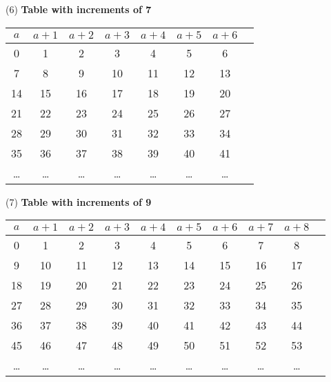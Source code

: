 \noindent
(6) \textbf{Table with increments of 7}\\
\begin{tabular}{c|ccccccc}
    $a$                        & $a+1$                       & $a+2$                       & $a+3$ & $a+4$ & $a+5$ & $a+6$ \\
    \hline
    \rowcolor{OliveGreen!10}0  & 1                           & 2                           & 3     & 4     & 5     & 6     \\
    \cellcolor{OliveGreen!10}7 & \cellcolor{OliveGreen!10} 8 & \cellcolor{OliveGreen!10} 9 & 10    & 11    & 12    & 13    \\
    14                         & 15                          & 16                          & 17    & 18    & 19    & 20    \\
    21                         & 22                          & 23                          & 24    & 25    & 26    & 27    \\
    28                         & 29                          & 30                          & 31    & 32    & 33    & 34    \\
    35                         & 36                          & 37                          & 38    & 39    & 40    & 41    \\
    \dots                      & \dots                       & \dots                       & \dots & \dots & \dots & \dots \\
\end{tabular}

\vspace{0.5cm} %

\noindent
(7) \textbf{Table with increments of 9}\\
\begin{tabular}{c|ccccccccc}
    $a$                       & $a+1$ & $a+2$ & $a+3$ & $a+4$ & $a+5$ & $a+6$ & $a+7$ & $a+8$ \\
    \hline
    \rowcolor{OliveGreen!10}0 & 1     & 2     & 3     & 4     & 5     & 6     & 7     & 8     \\
    \rowcolor{OliveGreen!10}9 & 10    & 11    & 12    & 13    & 14    & 15    & 16    & 17    \\
    18                        & 19    & 20    & 21    & 22    & 23    & 24    & 25    & 26    \\
    27                        & 28    & 29    & 30    & 31    & 32    & 33    & 34    & 35    \\
    36                        & 37    & 38    & 39    & 40    & 41    & 42    & 43    & 44    \\
    45                        & 46    & 47    & 48    & 49    & 50    & 51    & 52    & 53    \\
    \dots                     & \dots & \dots & \dots & \dots & \dots & \dots & \dots & \dots \\
\end{tabular}

